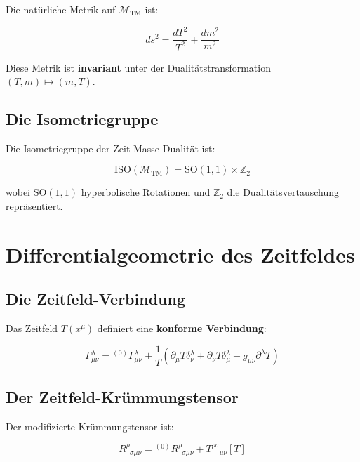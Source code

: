 \documentclass[12pt,a4paper]{report}
\begin{document}
	Die natürliche Metrik auf $\mathcal{M}_{\text{TM}}$ ist:
	
	\begin{equation}
		ds^2 = \frac{dT^2}{T^2} + \frac{dm^2}{m^2}
	\end{equation}
	
	Diese Metrik ist \textbf{invariant} unter der Dualitätstransformation $(T,m) \mapsto (m,T)$.
	
	\subsection{Die Isometriegruppe}
	
	Die Isometriegruppe der Zeit-Masse-Dualität ist:
	
	\begin{equation}
		\text{ISO}(\mathcal{M}_{\text{TM}}) = \text{SO}(1,1) \times \mathbb{Z}_2
	\end{equation}
	
	wobei $\text{SO}(1,1)$ hyperbolische Rotationen und $\mathbb{Z}_2$ die Dualitätsvertauschung repräsentiert.
	
	\section{Differentialgeometrie des Zeitfeldes}
	
	\subsection{Die Zeitfeld-Verbindung}
	
	Das Zeitfeld $T(x^\mu)$ definiert eine \textbf{konforme Verbindung}:
	
	\begin{equation}
		\Gamma^\lambda_{\mu\nu} = {}^{(0)}\Gamma^\lambda_{\mu\nu} + \frac{1}{T}(\partial_\mu T \delta^\lambda_\nu + \partial_\nu T \delta^\lambda_\mu - g_{\mu\nu} \partial^\lambda T)
	\end{equation}
	
	\subsection{Der Zeitfeld-Krümmungstensor}
	
	Der modifizierte Krümmungstensor ist:
	
	\begin{equation}
		R^\rho_{\phantom{\rho}\sigma\mu\nu} = {}^{(0)}R^\rho_{\phantom{\rho}\sigma\mu\nu} + T^{\rho\sigma}_{\phantom{\rho\sigma}\mu\nu}[T]
	\end{equation}
	
\end{document}
